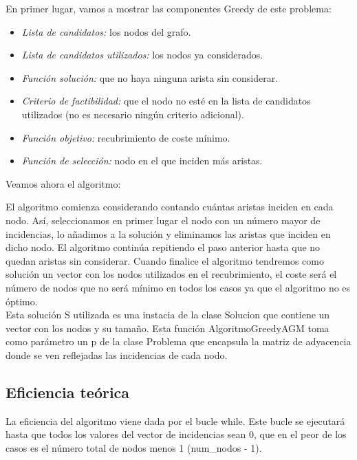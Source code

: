 \documentclass[11pt]{article}
\begin{document}
En primer lugar, vamos a mostrar las componentes Greedy de este problema:

\begin{itemize}
	\item \textit{Lista de candidatos:} los nodos del grafo.
	\item \textit{Lista de candidatos utilizados:} los nodos ya considerados.
	\item \textit{Función solución:} que no haya ninguna arista sin considerar.
	\item \textit{Criterio de factibilidad:} que el nodo no esté en la lista de candidatos utilizados (no es necesario ningún criterio adicional).
	\item \textit{Función objetivo:} recubrimiento de coste mínimo.
	\item \textit{Función de selección:} nodo en el que inciden más aristas.
\end{itemize}

Veamos ahora el algoritmo:

	
\vspace{1em}

El algoritmo comienza considerando contando cuántas aristas inciden en cada nodo. Así, seleccionamos en primer lugar el nodo con un número mayor de incidencias, lo añadimos a la solución y eliminamos las aristas que inciden en dicho nodo. El algoritmo continúa repitiendo el paso anterior hasta que no quedan aristas sin considerar. Cuando finalice el algoritmo tendremos como solución un vector con los nodos utilizados en el recubrimiento, el coste será el número de nodos que no será mínimo en todos los casos ya que el algoritmo no es óptimo.\\



Esta solución S utilizada es una instacia de la clase Solucion que contiene un vector con los nodos y su tamaño.
Esta función AlgoritmoGreedyAGM toma como parámetro un p de la clase Problema que encapsula la matriz de adyacencia donde se ven reflejadas las incidencias de cada nodo.

\subsection*{Eficiencia teórica}
La eficiencia del algoritmo viene dada por el bucle while. Este bucle se ejecutará hasta que todos los valores del vector de incidencias sean 0, que en el peor de los casos es el número total de nodos menos 1 (num\_nodos - 1).
\end{document}
